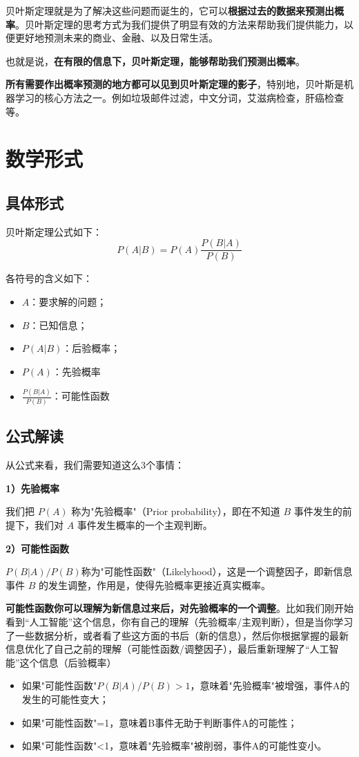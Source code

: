 \documentclass[12pt]{article}
\begin{document}
贝叶斯定理就是为了解决这些问题而诞生的，它可以\textbf{根据过去的数据来预测出概率}。贝叶斯定理的思考方式为我们提供了明显有效的方法来帮助我们提供能力，以便更好地预测未来的商业、金融、以及日常生活。

也就是说，\textbf{在有限的信息下，贝叶斯定理，能够帮助我们预测出概率}。

\textbf{所有需要作出概率预测的地方都可以见到贝叶斯定理的影子}，特别地，贝叶斯是机器学习的核心方法之一。例如垃圾邮件过滤，中文分词，艾滋病检查，肝癌检查等。

\section{数学形式}
\subsection{具体形式}
贝叶斯定理公式如下：
$$
P(A|B) = P(A) \frac{P(B|A)}{P(B)}
$$

各符号的含义如下：
\begin{itemize}
\setlength{\itemsep}{0pt}
\setlength{\parsep}{0pt}
\setlength{\parskip}{0pt}
    \item $A$：要求解的问题；
    \item $B$：已知信息；
    \item $P(A|B)$：后验概率；
    \item $P(A)$：先验概率
    \item $\frac{P(B|A)}{P(B)}$：可能性函数
\end{itemize}

\subsection{公式解读}
从公式来看，我们需要知道这么3个事情：

\textbf{1）先验概率}

我们把 $P(A)$ 称为"先验概率"（Prior probability），即在不知道 $B$ 事件发生的前提下，我们对 $A$ 事件发生概率的一个主观判断。

\textbf{2）可能性函数}

$P(B|A)/P(B)$称为"可能性函数"（Likelyhood），这是一个调整因子，即新信息事件 $B$ 的发生调整，作用是，使得先验概率更接近真实概率。

\textbf{可能性函数你可以理解为新信息过来后，对先验概率的一个调整}。比如我们刚开始看到“人工智能”这个信息，你有自己的理解（先验概率/主观判断），但是当你学习了一些数据分析，或者看了些这方面的书后（新的信息），然后你根据掌握的最新信息优化了自己之前的理解（可能性函数/调整因子），最后重新理解了“人工智能”这个信息（后验概率）
\begin{itemize}
\setlength{\itemsep}{0pt}
\setlength{\parsep}{0pt}
\setlength{\parskip}{0pt}
    \item 如果"可能性函数"$P(B|A)/P(B)>1$，意味着"先验概率"被增强，事件A的发生的可能性变大；

    \item 如果"可能性函数"=1，意味着B事件无助于判断事件A的可能性；

    \item 如果"可能性函数"<1，意味着"先验概率"被削弱，事件A的可能性变小。
\end{itemize}
\end{document}
